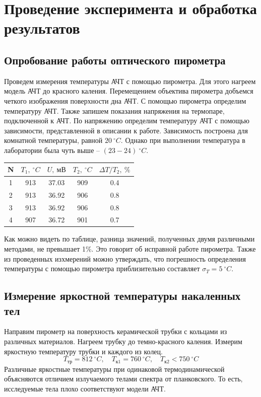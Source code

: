 \documentclass[14pt, a4paper]{report}
\begin{document}
\section{Проведение эксперимента и обработка результатов}

\subsection{Опробование работы оптического пирометра}

Проведем измерения температуры АЧТ с помощью пирометра. Для этого нагреем модель АЧТ до красного каления. Перемещением объектива пирометра добъемся четкого изображения поверхности дна АЧТ. С помощью пирометра определим температуру АЧТ. Также запишем показания напряжения на термопаре, подключенной к АЧТ. По напряжению определим температуру АЧТ с помощью зависимости, представленной в описании к работе. Зависимость построена для комнатной температуры, равной $20\ ^\circ C$. Однако при выполнении температура в лаборатории была чуть выше -- $(23-24)\ ^\circ C$.

\begin{table}[H]
\centering
\begin{tabular}{|c|c|c|c|c|}
\hline
N & $T_1,\ ^\circ C$ & $U,\ мВ$  & $T_2,\ ^\circ C$ & $\Delta T/T_2,\ \%$\\ \hline
1 & 913  & 37.03 & 909  & 0.4 \\ \hline
2 & 913  & 36.92 & 906  & 0.8 \\ \hline
3 & 913  & 36.92 & 906  & 0.8 \\ \hline
4 & 907  & 36.72 & 901  & 0.7 \\ \hline
\end{tabular}
\end{table}

Как можно видеть по таблице, разница значений, полученных двумя различными методами, не превышает 1\%. Это говорит об исправной работе пирометра.
Также из проведенных изхмерений можно утверждать, что погрешность определения температуры с помощью пирометра приблизительно составляет $\sigma_T=5\ ^\circ C$. 

\subsection{Измерение яркостной температуры накаленных тел}

Направим пирометр на поверхность керамической трубки с кольцами из различных материалов. Нагреем трубку до темно-красного каления.
Измерим яркостную температуру трубки и каждого из колец.
\[T_{тр}=812\ ^\circ C,\quad T_{к1}=760\ ^\circ C,\quad T_{к2}<750\ ^\circ C\]
Различные яркостные температуры при одинаковой термодинамической объясняются отличием излучаемого телами спектра от планковского. То есть, исследуемые тела плохо соответствуют модели АЧТ.
\end{document}
